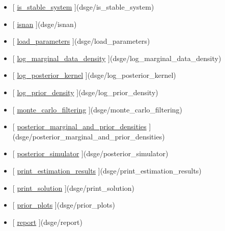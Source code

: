 \documentclass[letterpaper,10pt,english]{sphinxmanual}
\begin{document}
\begin{itemize}
\item {} 
{[} {\hyperref[classes/models/@dsge/dsge:is-stable-system]{is\_stable\_system}} {]}(dsge/is\_stable\_system)

\item {} 
{[} {\hyperref[classes/models/@dsge/dsge:isnan]{isnan}} {]}(dsge/isnan)

\item {} 
{[} {\hyperref[classes/models/@dsge/dsge:load-parameters]{load\_parameters}} {]}(dsge/load\_parameters)

\item {} 
{[} {\hyperref[classes/models/@dsge/dsge:log-marginal-data-density]{log\_marginal\_data\_density}} {]}(dsge/log\_marginal\_data\_density)

\item {} 
{[} {\hyperref[classes/models/@dsge/dsge:log-posterior-kernel]{log\_posterior\_kernel}} {]}(dsge/log\_posterior\_kernel)

\item {} 
{[} {\hyperref[classes/models/@dsge/dsge:log-prior-density]{log\_prior\_density}} {]}(dsge/log\_prior\_density)

\item {} 
{[} {\hyperref[classes/models/@dsge/dsge:monte-carlo-filtering]{monte\_carlo\_filtering}} {]}(dsge/monte\_carlo\_filtering)

\item {} 
{[} {\hyperref[classes/models/@dsge/dsge:posterior-marginal-and-prior-densities]{posterior\_marginal\_and\_prior\_densities}} {]}(dsge/posterior\_marginal\_and\_prior\_densities)

\item {} 
{[} {\hyperref[classes/models/@dsge/dsge:posterior-simulator]{posterior\_simulator}} {]}(dsge/posterior\_simulator)

\item {} 
{[} {\hyperref[classes/models/@dsge/dsge:print-estimation-results]{print\_estimation\_results}} {]}(dsge/print\_estimation\_results)

\item {} 
{[} {\hyperref[classes/models/@dsge/dsge:print-solution]{print\_solution}} {]}(dsge/print\_solution)

\item {} 
{[} {\hyperref[classes/models/@dsge/dsge:prior-plots]{prior\_plots}} {]}(dsge/prior\_plots)

\item {} 
{[} {\hyperref[classes/models/@dsge/dsge:report]{report}} {]}(dsge/report)


\end{itemize}
\end{document}

